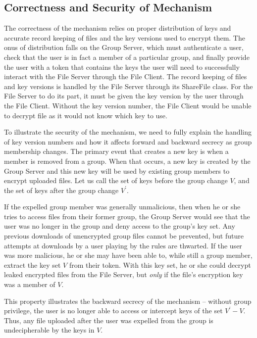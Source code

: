 \documentclass[11pt]{article}
\begin{document}
\subsection{Correctness and Security of Mechanism}
The correctness of the mechanism relies on proper distribution of keys and accurate record keeping of files and the key versions used to encrypt them. The onus of distribution falls on the Group Server, which must authenticate a user, check that the user is in fact a member of a particular group, and finally provide the user with a token that contains the keys the user will need to successfully interact with the File Server through the File Client. The record keeping of files and key versions is handled by the File Server through its \textsf{ShareFile} class. For the File Server to do its part, it must be given the key version by the user through the File Client. Without the key version number, the File Client would be unable to decrypt file as it would not know which key to use.

To illustrate the security of the mechanism, we need to fully explain the handling of key version numbers and how it affects forward and backward secrecy as group membership changes. The primary event that creates a new key is when a member is removed from a group. When that occurs, a new key is created by the Group Server and this new key will be used by existing group members to encrypt uploaded files. Let us call the set of keys before the group change $V$, and the set of keys after the group change $V^\prime$.

If the expelled group member was generally unmalicious, then when he or she tries to access files from their former group, the Group Server would see that the user was no longer in the group and deny access to the group's key set. Any previous downloads of unencrypted group files cannot be prevented, but future attempts at downloads by a user playing by the rules are thwarted. If the user was more malicious, he or she may have been able to, while still a group member, extract the key set $V$ from their token. With this key set, he or she could decrypt leaked encrypted files from the File Server, but \emph{only} if the file's encryption key was a member of $V$.

This property illustrates the backward secrecy of the mechanism -- without group privilege, the user is no longer able to access or intercept keys of the set $V^\prime-V$. Thus, any file uploaded after the user was expelled from the group is undecipherable by the keys in $V$.
\end{document}

